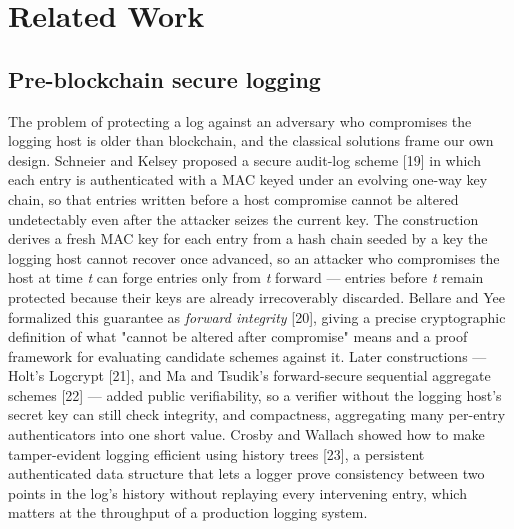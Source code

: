 \documentclass[journal]{IEEEtran}
\begin{document}
\section{Related Work}

\subsection{Pre-blockchain secure logging}

The problem of protecting a log against an adversary who compromises the logging host is older than blockchain, and the classical solutions frame our own design. Schneier and Kelsey proposed a secure audit-log scheme [19] in which each entry is authenticated with a MAC keyed under an evolving one-way key chain, so that entries written before a host compromise cannot be altered undetectably even after the attacker seizes the current key. The construction derives a fresh MAC key for each entry from a hash chain seeded by a key the logging host cannot recover once advanced, so an attacker who compromises the host at time \emph{t} can forge entries only from \emph{t} forward --- entries before \emph{t} remain protected because their keys are already irrecoverably discarded. Bellare and Yee formalized this guarantee as \emph{forward integrity} [20], giving a precise cryptographic definition of what "cannot be altered after compromise" means and a proof framework for evaluating candidate schemes against it. Later constructions --- Holt's Logcrypt [21], and Ma and Tsudik's forward-secure sequential aggregate schemes [22] --- added public verifiability, so a verifier without the logging host's secret key can still check integrity, and compactness, aggregating many per-entry authenticators into one short value. Crosby and Wallach showed how to make tamper-evident logging efficient using history trees [23], a persistent authenticated data structure that lets a logger prove consistency between two points in the log's history without replaying every intervening entry, which matters at the throughput of a production logging system.
\end{document}
